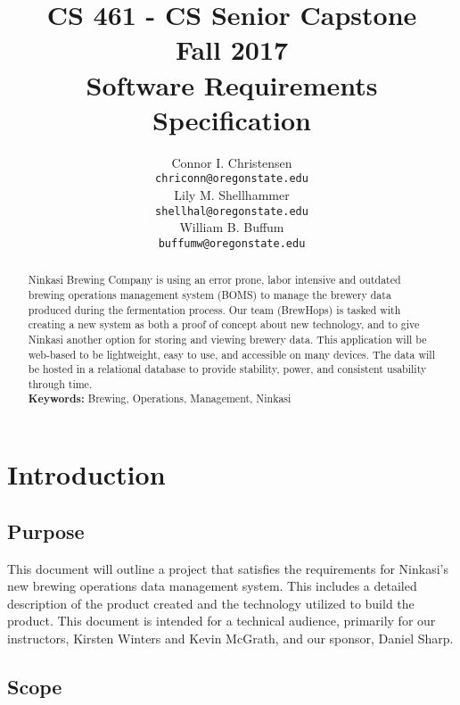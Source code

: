\documentclass[draftclsnofoot,onecolumn,letterpaper,10pt,compsoc]{IEEEtran}
\title{CS 461 - CS Senior Capstone
	\\Fall 2017
	\\Software Requirements Specification
}
\author{
	Connor I. Christensen \\
	\texttt{chriconn@oregonstate.edu}
	\\
	Lily M. Shellhammer \\
	\texttt{shellhal@oregonstate.edu}
	\\
	William B. Buffum \\
	\texttt{buffumw@oregonstate.edu}
}
\begin{document}
\begin{titlingpage}
    \maketitle
    \begin{abstract}
			Ninkasi Brewing Company is using an error prone, labor intensive and outdated brewing operations management system (BOMS) to manage the brewery data produced during the fermentation process.
			Our team (BrewHops) is tasked with creating a new system as both a proof of concept about new technology, and to give Ninkasi another option for storing and viewing brewery data.
			This application will be web-based to be lightweight, easy to use, and accessible on many devices.
			The data will be hosted in a relational database to provide stability, power, and consistent usability through time.
			\\
			\textbf{Keywords:} Brewing, Operations, Management, Ninkasi
    \end{abstract}
		\pagebreak
		\tableofcontents
\end{titlingpage}

\section{Introduction}
	\subsection{Purpose}
		This document will outline a project that satisfies the requirements for Ninkasi’s new brewing operations data management system.
		This includes a detailed description of the product created and the technology utilized to build the product.
		This document is intended for a technical audience, primarily for our instructors, Kirsten Winters and Kevin McGrath, and our sponsor, Daniel Sharp.

	\subsection{Scope}
\end{document}
